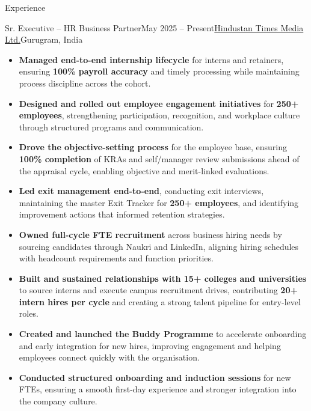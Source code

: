 \documentclass[hidelinks]{resume}
\begin{document}
\begin{rSection}{Experience}
    \begin{rSubsection}{Sr. Executive -- HR Business Partner}{May 2025 -- Present}{\href{https://www.hindustantimes.com/}{Hindustan Times Media Ltd.}}{Gurugram, India}
        \begin{itemize}[leftmargin=1.2em, itemsep=0pt, parsep=0pt, topsep=0pt, partopsep=0pt]
            \item \textcolor{neutral}{\textbf{Managed end-to-end internship lifecycle}} for interns and retainers, ensuring \textcolor{primary}{\textbf{100\% payroll accuracy}} and timely processing while maintaining process discipline across the cohort.
            \item \textcolor{neutral}{\textbf{Designed and rolled out employee engagement initiatives}} for \textcolor{primary}{\textbf{250+ employees}}, strengthening participation, recognition, and workplace culture through structured programs and communication.
            \item \textcolor{neutral}{\textbf{Drove the objective-setting process}} for the employee base, ensuring \textcolor{primary}{\textbf{100\% completion}} of KRAs and self/manager review submissions ahead of the appraisal cycle, enabling objective and merit-linked evaluations.
            \item \textcolor{neutral}{\textbf{Led exit management end-to-end}}, conducting exit interviews, maintaining the master Exit Tracker for \textcolor{primary}{\textbf{250+ employees}}, and identifying improvement actions that informed retention strategies.
            \item \textcolor{neutral}{\textbf{Owned full-cycle FTE recruitment}} across business hiring needs by sourcing candidates through Naukri and LinkedIn, aligning hiring schedules with headcount requirements and function priorities.
            \item \textcolor{neutral}{\textbf{Built and sustained relationships with 15+ colleges and universities}} to source interns and execute campus recruitment drives, contributing \textcolor{primary}{\textbf{20+ intern hires per cycle}} and creating a strong talent pipeline for entry-level roles.
            \item \textcolor{neutral}{\textbf{Created and launched the Buddy Programme}} to accelerate onboarding and early integration for new hires, improving engagement and helping employees connect quickly with the organisation.
            \item \textcolor{neutral}{\textbf{Conducted structured onboarding and induction sessions}} for new FTEs, ensuring a smooth first-day experience and stronger integration into the company culture.
        \end{itemize}
    \end{rSubsection}
\end{rSection}
\end{document}
